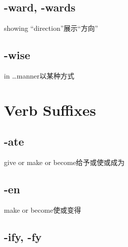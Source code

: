 \begin{nlist}{}{}
\end{nlist}

\subsection{-ward, -wards}

\begin{nlist}{showing ``direction''}{展示“方向”}
\end{nlist}

\subsection{-wise}

\begin{nlist}{in \ldots manner}{以某种方式}
\end{nlist}

\section{Verb Suffixes}

\subsection{-ate}

\begin{nlist}{give or make or become}{给予或使或成为}
\end{nlist}

\subsection{-en}

\begin{nlist}{make or become}{使或变得}
\end{nlist}

\subsection{-ify, -fy}

